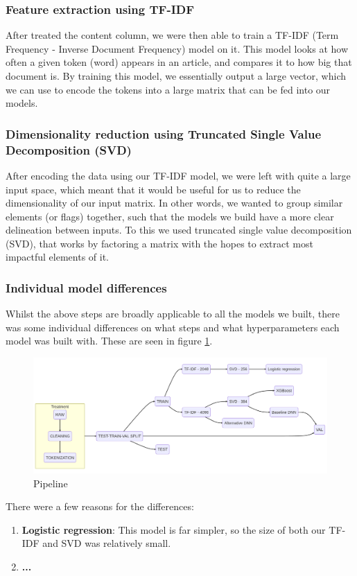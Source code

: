 \subsubsection{Feature extraction using TF-IDF}
After treated the content column, we were then able to train a TF-IDF (Term Frequency - Inverse Document Frequency)
model on it. This model looks at how often a given token (word) appears in an article, and compares it to how big that
document is. By training this model, we essentially output a large vector, which we can use to encode the tokens into a
large matrix that can be fed into our models.

\subsubsection{Dimensionality reduction using Truncated Single Value Decomposition (SVD)}
After encoding the data using our TF-IDF model, we were left with quite a large input space, which meant that it would
be useful for us to reduce the dimensionality of our input matrix. In other words, we wanted to group similar elements
(or flags) together, such that the models we build have a more clear delineation between inputs. To this we used
truncated single value decomposition (SVD), that works by factoring a matrix with the hopes to extract most impactful
elements of it.

\subsubsection{Individual model differences}
Whilst the above steps are broadly applicable to all the models we built, there was some individual differences on what
steps and what hyperparameters each model was built with. These are seen in figure \ref{fig:pipeline}.

\begin{figure}[htpb]
  \centering
  \includegraphics[width=1\textwidth]{pipeline}
  \caption{Pipeline}
  \label{fig:pipeline}
\end{figure}

There were a few reasons for the differences:
\begin{enumerate}
  \item \textbf{Logistic regression}: This model is far simpler, so the size of both our TF-IDF and SVD was relatively
    small.
  \item \textbf{...}
\end{enumerate}
